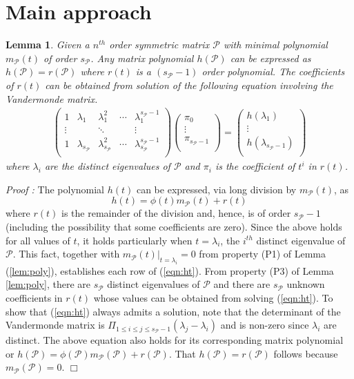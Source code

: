 \documentclass[onecolumn,reviewcopy]{autart}
\def \P{\mathcal{P}}
\newtheorem{lemma}{Lemma}
\begin{document}
\section{Main approach} \label{sec:main}
\begin{lemma} \label{eqn:mpoly}
Given a $n^{th}$ order symmetric matrix $\P$ with minimal polynomial $m_{\P}(t)$ of order $s_\P$. Any matrix polynomial $h(\P)$ can be expressed as $h(\P)=r(\P)$ where $r(t)$ is a $(s_\P -1)$ order polynomial. The coefficients of $r(t)$ can be obtained from solution of
the following equation involving the Vandermonde matrix.
\begin{align} \label{eqn:ht}
\left(
  \begin{array}{ccccc}
    1 & \lambda_1 & \lambda_1^2 & \cdots & \lambda_1^{{s_\P}-1} \\
    \vdots &  & \ddots &  & \vdots \\
    1 & \lambda_{s_\P} & \lambda_{s_\P}^2 & \cdots & \lambda_{s_\P}^{{s_\P} -1} \\
  \end{array}
  \right)  \left(
             \begin{array}{c}
               \pi_0 \\
               \vdots \\
               \pi_{{s_\P}-1} \\
             \end{array}
           \right)
  =\left(       \begin{array}{c}
                  h(\lambda_1) \\
                  \vdots \\
                  h(\lambda_{{s_\P}-1}) \\
                \end{array}
              \right)
\end{align}
where $\lambda_i$ are the distinct eigenvalues of $\P$ and $\pi_i$ is the coefficient of $t^i$ in $r(t)$.
\end{lemma}
\textit{Proof :}
The polynomial $h(t)$ can be expressed, via long division by $m_{\P}(t)$, as
$$h(t)=\phi(t)m_{\P}(t)+r(t)$$
where $r(t)$ is the remainder of the division and, hence, is of order $s_\P-1$ (including the possibility that some coefficients are zero). Since the above holds for all values of $t$, it holds particularly when $t=\lambda_i$, the $i^{th}$ distinct eigenvalue of $\P$. This fact, together with $m_{\P}(t)|_{t=\lambda_i}=0$ from property (P1) of Lemma (\ref{lem:poly}), establishes each row of (\ref{eqn:ht}).
From property (P3) of Lemma \ref{lem:poly}, there are $s_\P$ distinct eigenvalues of $\P$ and there are $s_\P$ unknown coefficients in $r(t)$ whose values can be obtained from solving (\ref{eqn:ht}). To show that (\ref{eqn:ht}) always admits a solution, note that the determinant of the Vandermonde matrix is $\Pi_{1 \le i \le j \le {s_\P}-1} (\lambda_j - \lambda_i)$ and is non-zero since $\lambda_i$ are distinct. The above equation also holds for its corresponding matrix polynomial or $h(\P)=\phi(\P)m_{\P}(\P)+r(\P)$. That $h(\P)=r(\P)$ follows because $m_{\P}(\P)=0$.
$\Box$
\end{document}
